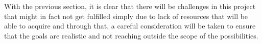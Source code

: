       With the previous section, it is clear that there will be challenges in this project that might in fact not get fulfilled simply due to lack of resources that will be able to acquire and through that, a careful consideration will be taken to ensure that the goals are realistic and not reaching outside the scope of the possibilities.